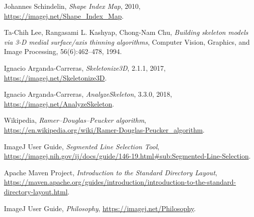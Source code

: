 \documentclass[declaration,shortabstract,mgr]{iithesis}
\begin{document}
\begin{thebibliography}{1}
  Johannes Schindelin,
  \emph{Shape Index Map},
  2010,
  \url{https://imagej.net/Shape_Index_Map}.

  Ta-Chih Lee, Rangasami L. Kashyap, Chong-Nam Chu,
  \emph{Building skeleton models via 3-D medial surface/axis thinning algorithms},
  Computer Vision, Graphics, and Image Processing,
  56(6):462--478,
  1994.

  Ignacio Arganda-Carreras,
  \emph{Skeletonize3D},
  2.1.1,
  2017,
  \url{https://imagej.net/Skeletonize3D}.

  Ignacio Arganda-Carreras,
  \emph{AnalyzeSkeleton},
  3.3.0,
  2018,
  \url{https://imagej.net/AnalyzeSkeleton}.
  
  Wikipedia,
  \emph{Ramer--Douglas--Peucker algorithm},
  \url{https://en.wikipedia.org/wiki/Ramer-Douglas-Peucker_algorithm}.
  
  ImageJ User Guide,
  \emph{Segmented Line Selection Tool},
  \url{https://imagej.nih.gov/ij/docs/guide/146-19.html#sub:Segmented-Line-Selection}.
  
  Apache Maven Project,
  \emph{Introduction to the Standard Directory Layout},
  \url{https://maven.apache.org/guides/introduction/introduction-to-the-standard-directory-layout.html}.

  ImageJ User Guide,
  \emph{Philosophy},
  \url{https://imagej.net/Philosophy}.

\end{thebibliography}
\end{document}
